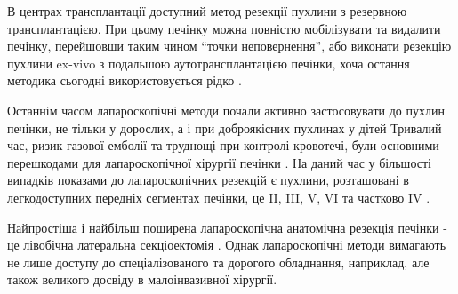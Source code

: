 В центрах трансплантації доступний метод резекції пухлини з резервною трансплантацією. При цьому печінку можна повністю мобілізувати та видалити печінку, перейшовши таким чином “точки неповернення”, або виконати резекцію пухлини ex-vivo з подальшою аутотрансплантацією печінки, хоча остання методика сьогодні використовується рідко \cite{pmid34464895}.

Останнім часом лапароскопічні методи почали активно застосовувати до пухлин печінки, не тільки у дорослих, а і при доброякісних пухлинах у дітей \cite{pmid7796018} Тривалий час, ризик газової емболії та труднощі при контролі кровотечі, були основними перешкодами для лапароскопічної хірургії печінки \cite{pmid8640025}. На даний час у більшості випадків показами до лапароскопічних резекцій є пухлини, розташовані в легкодоступних передніх сегментах печінки, це II, III, V, VI та частково IV \cite{pmid8749932}. 

Найпростіша і найбільш поширена лапароскопічна анатомічна резекція печінки - це лівобічна латеральна секціоектомія \cite{pmid9149752}. Однак лапароскопічні методи вимагають не лише доступу до спеціалізованого та дорогого обладнання, наприклад, але також великого досвіду в малоінвазивної хірургії.

